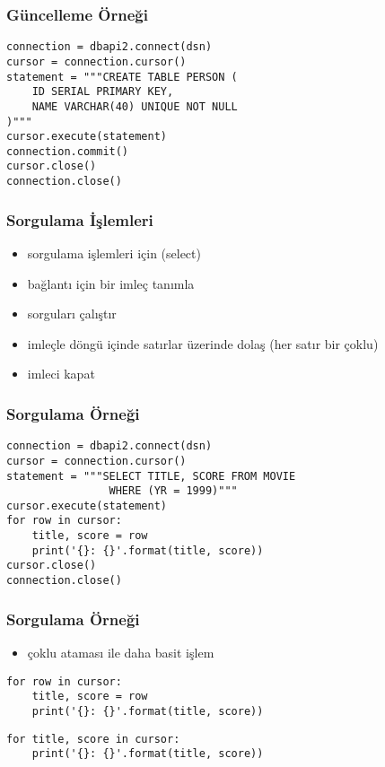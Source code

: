 \documentclass[dvipsnames]{beamer}
\theoremstyle{plain}
\begin{document}
\begin{frame}[fragile]
  \frametitle{Güncelleme Örneği}

  \begin{lstlisting}
connection = dbapi2.connect(dsn)
cursor = connection.cursor()
statement = """CREATE TABLE PERSON (
    ID SERIAL PRIMARY KEY,
    NAME VARCHAR(40) UNIQUE NOT NULL
)"""
cursor.execute(statement)
connection.commit()
cursor.close()
connection.close()
  \end{lstlisting}
\end{frame}

\begin{frame}
  \frametitle{Sorgulama İşlemleri}

  \begin{itemize}
    \item sorgulama işlemleri için (select)

    \bigskip
    \item bağlantı için bir imleç tanımla
    \item sorguları çalıştır
    \item imleçle döngü içinde satırlar üzerinde dolaş (her satır bir çoklu)
    \item imleci kapat
  \end{itemize}
\end{frame}

\begin{frame}[fragile]
  \frametitle{Sorgulama Örneği}

  \begin{lstlisting}
connection = dbapi2.connect(dsn)
cursor = connection.cursor()
statement = """SELECT TITLE, SCORE FROM MOVIE
                WHERE (YR = 1999)"""
cursor.execute(statement)
for row in cursor:
    title, score = row
    print('{}: {}'.format(title, score))
cursor.close()
connection.close()
  \end{lstlisting}
\end{frame}

\begin{frame}[fragile]
  \frametitle{Sorgulama Örneği}

  \begin{itemize}
    \item çoklu ataması ile daha basit işlem
  \end{itemize}

  \begin{lstlisting}
for row in cursor:
    title, score = row
    print('{}: {}'.format(title, score))
  \end{lstlisting}

  \begin{lstlisting}
for title, score in cursor:
    print('{}: {}'.format(title, score))
  \end{lstlisting}
\end{frame}
\end{document}
